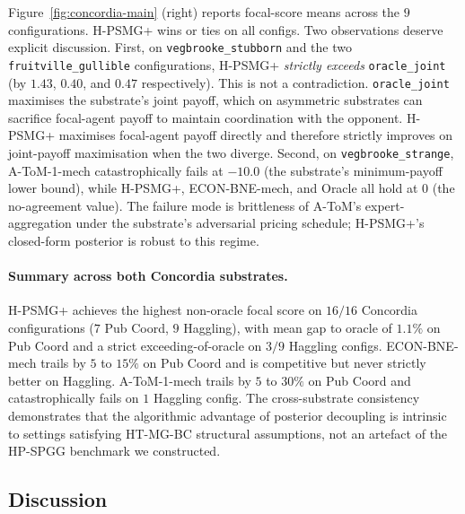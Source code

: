 \documentclass{article}
\def\textsuperscript#1{#1}%
\begin{document}
Figure~\ref{fig:concordia-main} (right) reports focal-score means across the $9$
configurations. H-PSMG\textsuperscript{+} wins or ties on all configs. Two
observations deserve explicit discussion. First, on
\texttt{vegbrooke\_stubborn} and the two \texttt{fruitville\_gullible}
configurations, H-PSMG\textsuperscript{+} \emph{strictly exceeds} \texttt{oracle\_joint}
(by $1.43$, $0.40$, and $0.47$ respectively). This is not a contradiction.
\texttt{oracle\_joint} maximises the substrate's joint payoff, which on asymmetric
substrates can sacrifice focal-agent payoff to maintain coordination with the
opponent. H-PSMG\textsuperscript{+} maximises focal-agent payoff directly and
therefore strictly improves on joint-payoff maximisation when the two diverge.
Second, on \texttt{vegbrooke\_strange}, A-ToM-1-mech catastrophically fails at
$-10.0$ (the substrate's minimum-payoff lower bound), while
H-PSMG\textsuperscript{+}, ECON-BNE-mech, and Oracle all hold at $0$ (the
no-agreement value). The failure mode is brittleness of A-ToM's
expert-aggregation under the substrate's adversarial pricing schedule;
H-PSMG\textsuperscript{+}'s closed-form posterior is robust to this regime.

\paragraph{Summary across both Concordia substrates.} H-PSMG\textsuperscript{+}
achieves the highest non-oracle focal score on $16 / 16$ Concordia
configurations ($7$ Pub Coord, $9$ Haggling), with mean gap to oracle of
$1.1\%$ on Pub Coord and a strict exceeding-of-oracle on $3 / 9$ Haggling
configs. ECON-BNE-mech trails by $5$ to $15\%$ on Pub Coord and is competitive
but never strictly better on Haggling. A-ToM-1-mech trails by $5$ to $30\%$ on
Pub Coord and catastrophically fails on $1$ Haggling config. The
cross-substrate consistency demonstrates that the algorithmic advantage of
posterior decoupling is intrinsic to settings satisfying HT-MG-BC structural
assumptions, not an artefact of the HP-SPGG benchmark we constructed.

\subsection{Discussion}
\end{document}
